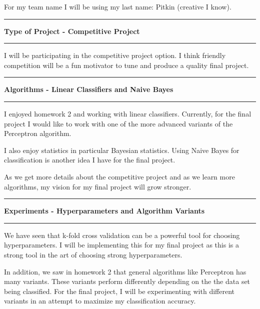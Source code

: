 \documentclass[11pt]{article}
\newcommand\question[2]{\vspace{.25in}\hrule\textbf{#1#2}\vspace{.5em}\hrule\vspace{.10in}}
\begin{document}
\raggedright
\newcommand\NAME{Jake Pitkin}  %
\newcommand\UID{u0891770}     %
\newcommand\HWNUM{2}              %

For my team name I will be using my last name: Pitkin (creative I know).

\question{}{Type of Project - Competitive Project}

I will be participating in the competitive project option. I think friendly competition will be a fun motivator to tune and produce a quality final project.

\question{}{Algorithms - Linear Classifiers and Naive Bayes}

I enjoyed homework 2 and working with linear classifiers. Currently, for the final project I would like to work with one of the more advanced variants of the Perceptron algorithm.

I also enjoy statistics in particular Bayesian statistics. Using Naive Bayes for classification is another idea I have for the final project.

As we get more details about the competitive project and as we learn more algorithms, my vision for my final project will grow stronger.

\question{}{Experiments - Hyperparameters and Algorithm Variants}

We have seen that k-fold cross validation can be a powerful tool for choosing hyperparameters. I will be implementing this for my final project as this is a strong tool in the art of choosing strong hyperparameters.

In addition, we saw in homework 2 that general algorithms like Perceptron has many variants. These variants perform differently depending on the the data set being classified. For the final project, I will be experimenting with different variants in an attempt to maximize my classification accuracy.
\end{document}
